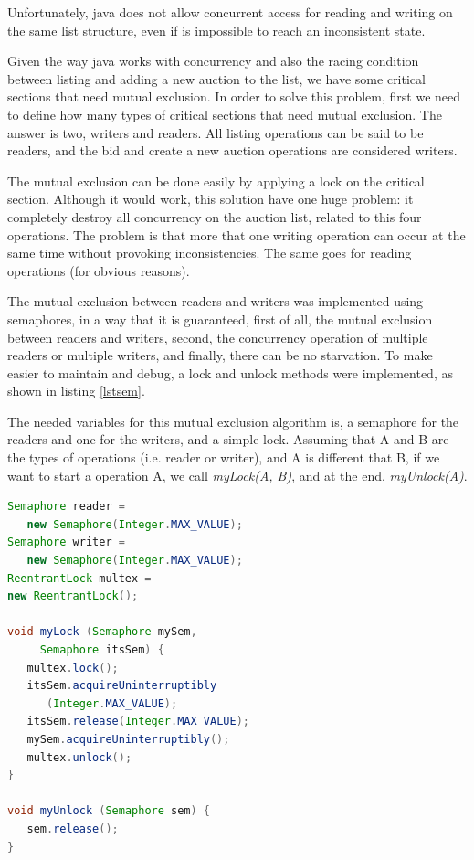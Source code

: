 \documentclass[twocolumn,10pt]{article}
\begin{document}
Unfortunately, java does not allow concurrent access for reading and writing on the same list structure, even if is impossible to reach an inconsistent state. 

Given the way java works with concurrency and also the racing condition between listing and adding a new auction to the list, we have some critical sections that need mutual exclusion. In order to solve this problem, first we need to define how many types of critical sections that need mutual exclusion. The answer is two, writers and readers. All listing operations can be said to be readers, and the bid and create a new auction operations are considered writers.

The mutual exclusion can be done easily by applying a lock on the critical section. Although it would work, this solution have one huge problem: it completely destroy all concurrency on the auction list, related to this four operations. The problem is that more that one writing operation can occur at the same time without provoking inconsistencies. The same goes for reading operations (for obvious reasons).

The mutual exclusion between readers and writers was implemented using semaphores, in a way that it is guaranteed, first of all, the mutual exclusion between readers and writers, second, the concurrency operation of multiple readers or multiple writers, and finally, there can be no starvation. To make easier to maintain and debug, a lock and unlock methods were implemented, as shown in listing \ref{lstsem}.

The needed variables for this mutual exclusion  algorithm is, a semaphore for the readers and one for the writers, and a simple lock. Assuming that A and B are the types of operations (i.e. reader or writer), and A is different that B, if we want to start a operation A, we call \textit{myLock(A, B)}, and at the end, \textit{myUnlock(A)}.

\begin{lstlisting}[caption=Semaphore operations, label=lstsem, language=java]
Semaphore reader = 
   new Semaphore(Integer.MAX_VALUE);
Semaphore writer = 
   new Semaphore(Integer.MAX_VALUE);
ReentrantLock multex = 
new ReentrantLock();

void myLock (Semaphore mySem, 
     Semaphore itsSem) {
   multex.lock();
   itsSem.acquireUninterruptibly
      (Integer.MAX_VALUE);
   itsSem.release(Integer.MAX_VALUE);
   mySem.acquireUninterruptibly();
   multex.unlock();
}

void myUnlock (Semaphore sem) {
   sem.release();
}
\end{lstlisting}
\end{document}
